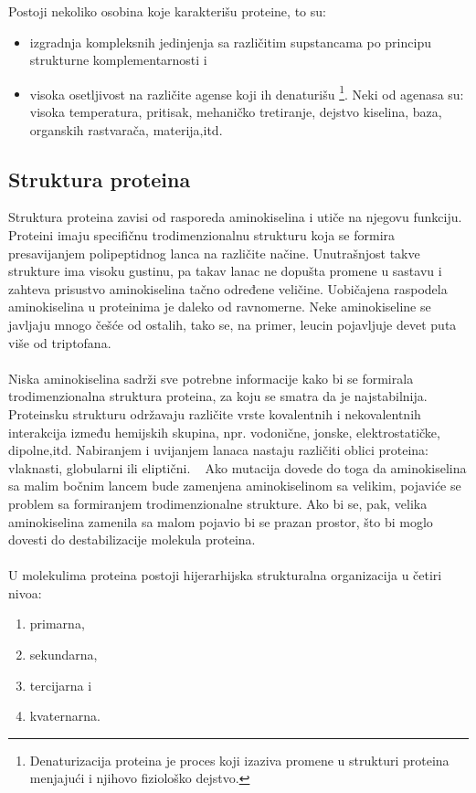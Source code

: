 Postoji nekoliko osobina koje karakterišu proteine, to su:
\begin{itemize}
\item izgradnja kompleksnih jedinjenja sa različitim supstancama po principu strukturne komplementarnosti i  
\item visoka osetljivost na različite agense koji ih denaturišu \footnote{Denaturizacija proteina je proces koji izaziva promene u strukturi proteina menjajući i njihovo fiziološko dejstvo.}. Neki od agenasa su: visoka temperatura, pritisak, mehaničko tretiranje, dejstvo kiselina, baza, organskih rastvarača, materija,itd.~\cite{spasic}
\end{itemize}
 
\subsection{Struktura proteina}
Struktura proteina zavisi od rasporeda aminokiselina i utiče na njegovu funkciju. Proteini imaju specifičnu trodimenzionalnu strukturu koja se formira presavijanjem polipeptidnog lanca na različite načine. Unutrašnjost takve strukture ima visoku gustinu, pa takav lanac ne dopušta promene u sastavu i zahteva prisustvo aminokiselina tačno određene veličine.
Uobičajena raspodela aminokiselina u proteinima je daleko od ravnomerne. Neke aminokiseline se javljaju mnogo češće od ostalih, tako se, na primer, leucin pojavljuje devet puta više od triptofana. \\\\
Niska aminokiselina sadrži sve potrebne informacije kako bi se formirala trodimenzionalna struktura proteina, za koju se smatra da je najstabilnija. Proteinsku strukturu održavaju različite vrste kovalentnih i nekovalentnih interakcija između hemijskih skupina, npr. vodonične, jonske, elektrostatičke, dipolne,itd. Nabiranjem i uvijanjem lanaca nastaju različiti oblici proteina: vlaknasti, globularni ili eliptični. ~\cite{medbio}
Ako mutacija dovede do toga da aminokiselina sa malim bočnim lancem bude zamenjena aminokiselinom sa velikim, pojaviće se problem sa formiranjem trodimenzionalne strukture. Ako bi se, pak, velika aminokiselina zamenila sa malom pojavio bi se prazan prostor, što bi moglo dovesti do destabilizacije molekula proteina. \\\\
U molekulima proteina postoji hijerarhijska strukturalna organizacija u četiri nivoa:
\begin{enumerate}
\item primarna,
\item sekundarna,
\item tercijarna i
\item kvaternarna.~\cite{spasic}
\end{enumerate}
